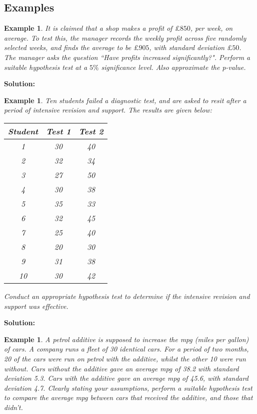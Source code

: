 \documentclass[12pt]{article}
\newtheorem{example}[theorem]{Example}
\begin{document}
\subsection{Examples}
\begin{example}
It is claimed that a shop makes a profit of $\pounds850$, per week, on average. To test this, the manager records the weekly profit across five randomly selected weeks, and finds the average to be $\pounds905$, with standard deviation $\pounds50$. The manager asks the question ``Have profits increased significantly?". Perform a suitable hypothesis test at a $5\%$ significance level. Also approximate the p-value.
\end{example}

\begin{mdframed}
\bf{Solution:}
\textcolor[rgb]{1.00,1.00,1.00}{\lipsum[1-4]}
\end{mdframed}

\begin{example}
Ten students failed a diagnostic test, and are asked to resit after a period of intensive revision and support. The results are given below:
\begin{center}
\begin{tabular}{|c|c|c|}
  \hline
  Student & Test 1 & Test 2 \\ \hline
  1 & 30 & 40 \\
  2 & 32 & 34 \\
  3 & 27 & 50 \\
  4 & 30 & 38 \\
  5 & 35 & 33 \\
  6 & 32 & 45 \\
  7 & 25 & 40 \\
  8 & 20 & 30 \\
  9 & 31 & 38 \\
  10 & 30 & 42 \\
  \hline
\end{tabular}
\end{center}
Conduct an appropriate hypothesis test to determine if the intensive revision and support was effective.
\end{example}

\begin{mdframed}
\bf{Solution:}
\textcolor[rgb]{1.00,1.00,1.00}{\lipsum[1-4]}
\end{mdframed}

\begin{example}
A petrol additive is supposed to increase the mpg (miles per gallon) of cars. A company runs a fleet of 30 identical cars. For a period of two months, 20 of the cars were run on petrol with the additive, whilst the other 10 were run without. Cars without the additive gave an average mpg of 38.2 with standard deviation 5.3. Cars with the additive gave an average mpg of 45.6, with standard deviation 4.7. Clearly stating your assumptions, perform a suitable hypothesis test to compare the average mpg between cars that received the additive, and those that didn't.
\end{example}
\end{document}
